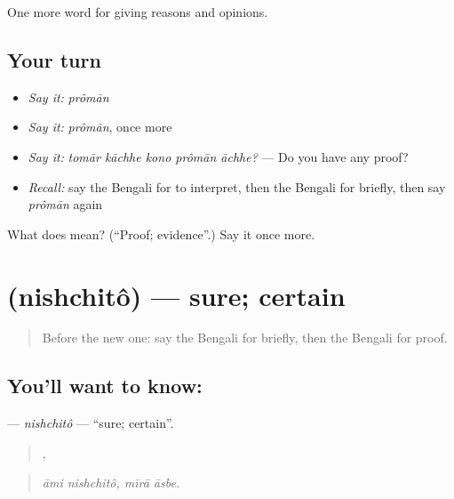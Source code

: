 \begin{grammarlens}[title={What you've built}]
One more word for giving reasons and opinions.
\end{grammarlens}

\subsection*{Your turn}
\begin{itemize}
\raggedright
  \item \emph{Say it:} \emph{prômān}
  \item \emph{Say it:} \emph{prômān}, once more
  \item \emph{Say it:} \emph{tomār kāchhe kono prômān āchhe?} — Do you have any proof?
  \item \emph{Recall:} say the Bengali for to interpret, then the Bengali for briefly, then say \emph{prômān} again
\end{itemize}

\begin{tcolorbox}[breakable,colback=teal!4,colframe=teal!35!black,title={Before you move on}]
What does  mean? (\textquotedblleft{}Proof; evidence\textquotedblright{}.) Say it once more.
\end{tcolorbox}
\section[\texorpdfstring{\bn{নিশ্চিত} (nishchitô)}{নিশ্চিত (nishchitô)}]{ (nishchitô) — sure; certain}

\label{lesson:BN-C337-nishchito}



\begin{quote}
Before the new one: say the Bengali for briefly, then the Bengali for proof.
\end{quote}

\subsection*{You'll want to know: }
\textbf{} — \emph{nishchitô} — \textquotedblleft{}sure; certain\textquotedblright{}.

\begin{quote}
 ,  
\end{quote}

\begin{quote}
\emph{āmi nishchitô, mīrā āsbe.}
\end{quote}

